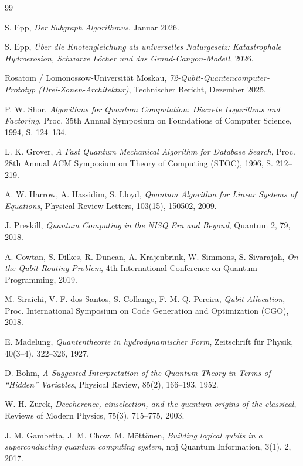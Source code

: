 ﻿\documentclass[a4paper,12pt]{article}
\theoremstyle{definition}
\begin{document}
\begin{thebibliography}{99}

S. Epp,
\textit{Der Subgraph Algorithmus}, Januar 2026.

S. Epp,
\textit{Über die Knotengleichung als universelles Naturgesetz: Katastrophale
Hydroerosion, Schwarze Löcher und das Grand-Canyon-Modell}, 2026.

Rosatom / Lomonossow-Universität Moskau,
\textit{72-Qubit-Quantencomputer-Prototyp (Drei-Zonen-Architektur)},
Technischer Bericht, Dezember 2025.

P. W. Shor,
\textit{Algorithms for Quantum Computation: Discrete Logarithms and Factoring},
Proc. 35th Annual Symposium on Foundations of Computer Science, 1994, S. 124--134.

L. K. Grover,
\textit{A Fast Quantum Mechanical Algorithm for Database Search},
Proc. 28th Annual ACM Symposium on Theory of Computing (STOC), 1996, S. 212--219.

A. W. Harrow, A. Hassidim, S. Lloyd,
\textit{Quantum Algorithm for Linear Systems of Equations},
Physical Review Letters, 103(15), 150502, 2009.

J. Preskill,
\textit{Quantum Computing in the NISQ Era and Beyond},
Quantum 2, 79, 2018.

A. Cowtan, S. Dilkes, R. Duncan, A. Krajenbrink, W. Simmons, S. Sivarajah,
\textit{On the Qubit Routing Problem},
4th International Conference on Quantum Programming, 2019.

M. Siraichi, V. F. dos Santos, S. Collange, F. M. Q. Pereira,
\textit{Qubit Allocation},
Proc. International Symposium on Code Generation and Optimization (CGO), 2018.

E. Madelung,
\textit{Quantentheorie in hydrodynamischer Form},
Zeitschrift für Physik, 40(3--4), 322--326, 1927.

D. Bohm,
\textit{A Suggested Interpretation of the Quantum Theory in Terms of ``Hidden''
Variables},
Physical Review, 85(2), 166--193, 1952.

W. H. Zurek,
\textit{Decoherence, einselection, and the quantum origins of the classical},
Reviews of Modern Physics, 75(3), 715--775, 2003.

J. M. Gambetta, J. M. Chow, M. Möttönen,
\textit{Building logical qubits in a superconducting quantum computing system},
npj Quantum Information, 3(1), 2, 2017.


\end{thebibliography}
\end{document}
